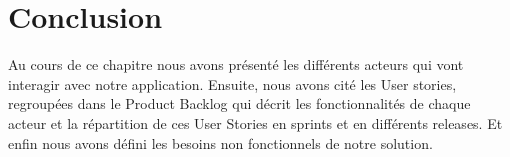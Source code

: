 \section*{Conclusion}
Au cours de ce chapitre nous avons présenté les différents acteurs qui vont interagir avec notre application. Ensuite, nous avons cité les User stories, regroupées dans le Product Backlog qui décrit les fonctionnalités de chaque acteur et la répartition de ces User Stories en sprints et en différents releases. Et enfin nous avons défini les besoins non fonctionnels de notre solution.